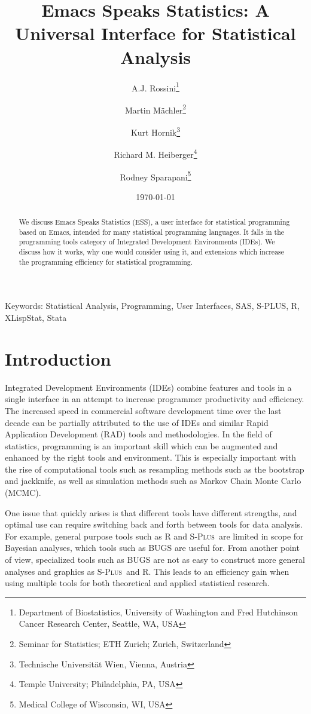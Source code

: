 \documentclass{article}
\title{Emacs Speaks Statistics: A Universal Interface for
  Statistical Analysis}
\author{A.J. Rossini\footnote{Department of Biostatistics, University
    of Washington and Fred Hutchinson Cancer Research Center, Seattle,
    WA, USA} \and Martin M{\"a}chler\footnote{Seminar for Statistics;
    ETH Zurich; Zurich, Switzerland} \and Kurt
  Hornik\footnote{Technische Universit{\"a}t Wien, Vienna, Austria}
  \and Richard M. Heiberger\footnote{Temple University; Philadelphia,
    PA, USA} \and Rodney Sparapani\footnote{Medical College of
    Wisconsin, WI, USA}}
\date{\today}
\newif\ifpdf
\newcommand*{\Splus}{\textsc{S-Plus}}
\begin{document}
\ifpdf
  \DeclareGraphicsExtensions{.jpg,.pdf,.png,.mps}
\fi


\maketitle

Keywords: Statistical Analysis, Programming, User Interfaces, SAS,
S-PLUS, R, XLispStat, Stata

\begin{abstract}
  We discuss Emacs Speaks Statistics (ESS), a user interface for
  statistical programming based on Emacs, intended for many
  statistical programming languages.  It falls in the programming
  tools category of Integrated Development Environments (IDEs).  We
  discuss how it works, why one would consider using it, and
  extensions which increase the programming efficiency for statistical
  programming.
\end{abstract}

\section{Introduction}
\label{sec:intro}

Integrated Development Environments (IDEs) combine features and tools
in a single interface in an attempt to increase programmer
productivity and efficiency.  The increased speed in commercial
software development time over the last decade can be partially
attributed to the use of IDEs and similar Rapid Application
Development (RAD) tools and methodologies.  In the field of
statistics, programming is an important skill which can be augmented
and enhanced by the right tools and environment.  This is especially
important with the rise of computational tools such as resampling
methods such as the bootstrap and jackknife, as well as simulation
methods such as Markov Chain Monte Carlo (MCMC).

One issue that quickly arises is that different tools have different
strengths, and optimal use can require switching back and forth
between tools for data analysis.  For example, general purpose tools
such as R \citep{ihak:gent:1996} and \Splus\ are limited in scope for
Bayesian analyses, which tools such as BUGS are useful for.  From
another point of view, specialized tools such as BUGS are not as easy
to construct more general analyses and graphics as \Splus\ and R.  This
leads to an efficiency gain when using multiple tools for both
theoretical and applied statistical research.
\end{document}
